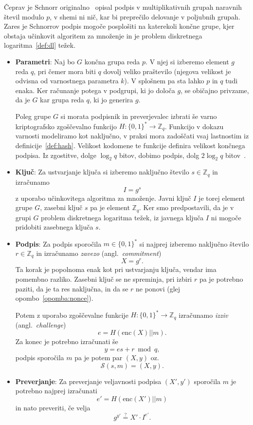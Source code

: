 \documentclass[isrm2, tisk]{fmfdelo}
\newcommand{\Z}{\mathbb Z}
\begin{document}
Čeprav je Schnorr originalno~\cite{schnorr1989sig} opisal podpis v multiplikativnih grupah naravnih
števil modulo $p$, v shemi ni nič, kar bi preprečilo delovanje v poljubnih grupah. Zares
je Schnorrov podpis mogoče posplošiti na katerekoli končne grupe, kjer obstaja učinkovit algoritem
za množenje in je problem diskretnega logaritma~\ref{def:dl} težek.
\begin{itemize}
    \item \textbf{Parametri}:
    Naj bo $G$ končna grupa reda $p$. V njej si izberemo element $g$ reda $q$, pri čemer mora
    biti $q$ dovolj veliko praštevilo (njegova velikost je odvisna od varnostnega parametra $k$).
    V splošnem pa sta lahko $p$ in $q$ tudi enaka. Ker računanje potega v podgrupi, ki jo določa $g$,
    se običajno privzame, da je $G$ kar grupa reda $q$, ki jo generira $g$.

    Poleg grupe $G$ si morata podpisnik in preverjevalec izbrati še varno kriptografsko zgoščevalno
    funkcijo $H : \{0, 1\}^* \rightarrow \Z_q$. Funkcijo v dokazu varnosti modeliramo kot naključno,
    v praksi mora zadoščati vsaj lastnostim iz definicije~\ref{def:hash}. Velikost kodomene te funkcije
    definira velikost končnega podpisa. Iz zgostitve, dolge $\log_2 q$ bitov, dobimo podpis, dolg
    $2 \log_2 q$ bitov~\cite{stinson2023crypto}.
    \item \textbf{Ključ}:
    Za ustvarjanje ključa si izberemo naključno število $s \in \Z_q$ in izračunamo
    $$
    I = g^s
    $$
    z uporabo učinkovitega algoritma za množenje. Javni ključ $I$ je torej element grupe $G$, zasebni ključ
    $s$ pa je element $\Z_q$. Ker smo predpostavili, da je v grupi $G$ problem diskretnega logaritma
    težek, iz javnega ključa $I$ ni mogoče pridobiti zasebnega ključa $s$.

    \item \textbf{Podpis}:
    Za podpis sporočila $m \in \{0, 1\}^*$ si najprej izberemo naključno število $r \in \Z_q$ in izračunamo
    \textit{zavezo} (angl.\ \textit{commitment})
    $$
    X = g^r.
    $$
    Ta korak je popolnoma enak kot pri ustvarjanju ključa, vendar ima pomembno razliko. Zasebni
    ključ se ne spreminja, pri izbiri $r$ pa je potrebno paziti, da je ta res naključna, in da se
    $r$ ne ponovi (glej opombo~\ref{opomba:nonce}).

    Potem z uporabo zgoščevalne funkcije $H : \{0, 1\}^* \rightarrow \Z_q$ izračunamo \textit{izziv}
    (angl.\ \textit{challenge})
    $$
    e = H(\text{enc}(X) || m).
    $$
    Za konec je potrebno izračunati še
    $$ 
    y = es + r \bmod q,
    $$
    podpis sporočila $m$ pa je potem par $(X, y)$ oz.\
    $$ 
    \mathcal{S}(s, m) = (X, y).
    $$

    \item \textbf{Preverjanje}:
    Za preverjanje veljavnosti podpisa $(X', y')$ sporočila $m$ je potrebno najprej izračunati
    $$
    e' = H(\text{enc}(X') || m)
    $$
    in nato preveriti, če velja
    $$
    g^{y'} \stackrel{?}{=} X' \cdot I^{e'}.
    $$
\end{itemize}
\end{document}
